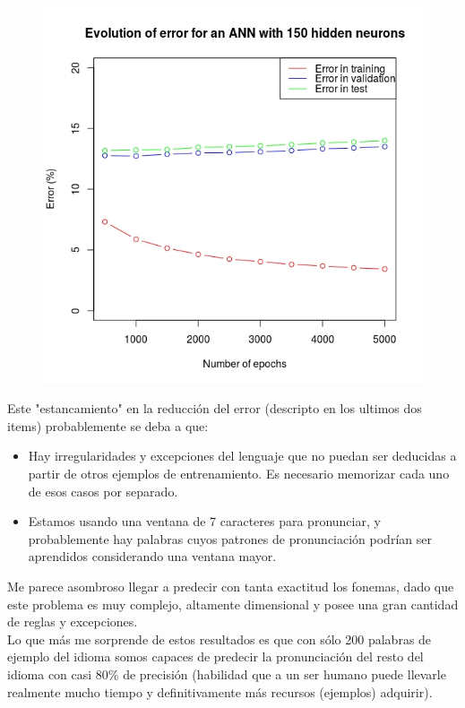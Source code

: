 \documentclass[paper=a4, fontsize=11pt]{scrartcl} %
\numberwithin{equation}{section} %
\numberwithin{figure}{section} %
\numberwithin{table}{section} %
\begin{document}
\begin{figure}[h!]
\centering
\includegraphics[width=112mm]{annresults2.jpg}
\end{figure}

Este "estancamiento" en la reducción del error (descripto en los ultimos dos items) probablemente se deba a que:

\begin{itemize}
\item Hay irregularidades y excepciones del lenguaje que no puedan ser deducidas a partir de otros ejemplos de entrenamiento. Es necesario memorizar cada uno de esos casos por separado.
\item Estamos usando una ventana de 7 caracteres para pronunciar, y probablemente hay palabras cuyos patrones de pronunciación podrían ser aprendidos considerando una ventana mayor.
\end{itemize}


Me parece asombroso llegar a predecir con tanta exactitud los fonemas, dado que este problema es muy complejo, altamente dimensional y posee una gran cantidad de reglas y excepciones. \\

Lo que más me sorprende de estos resultados es que con sólo 200 palabras de ejemplo del idioma somos capaces de predecir la pronunciación del resto del idioma con casi 80\% de precisión (habilidad que a un ser humano puede llevarle realmente mucho tiempo y definitivamente más recursos (ejemplos) adquirir). \\
\end{document}
